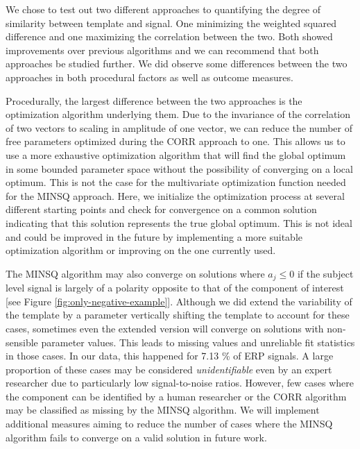 \documentclass[
  man]{apa7}
\begin{document}
We chose to test out two different approaches to quantifying the degree of similarity between template and signal. One minimizing the weighted squared difference and one maximizing the correlation between the two. Both showed improvements over previous algorithms and we can recommend that both approaches be studied further. We did observe some differences between the two approaches in both procedural factors as well as outcome measures.

Procedurally, the largest difference between the two approaches is the optimization algorithm underlying them. Due to the invariance of the correlation of two vectors to scaling in amplitude of one vector, we can reduce the number of free parameters optimized during the CORR approach to one. This allows us to use a more exhaustive optimization algorithm that will find the global optimum in some bounded parameter space without the possibility of converging on a local optimum. This is not the case for the multivariate optimization function needed for the MINSQ approach. Here, we initialize the optimization process at several different starting points and check for convergence on a common solution indicating that this solution represents the true global optimum. This is not ideal and could be improved in the future by implementing a more suitable optimization algorithm or improving on the one currently used.

The MINSQ algorithm may also converge on solutions where \(a_j \le 0\) if the subject level signal is largely of a polarity opposite to that of the component of interest {[}see Figure \ref{fig:only-negative-example}{]}. Although we did extend the variability of the template by a parameter vertically shifting the template to account for these cases, sometimes even the extended version will converge on solutions with non-sensible parameter values. This leads to missing values and unreliable fit statistics in those cases. In our data, this happened for 7.13 \% of ERP signals. A large proportion of these cases may be considered \emph{unidentifiable} even by an expert researcher due to particularly low signal-to-noise ratios. However, few cases where the component can be identified by a human researcher or the CORR algorithm may be classified as missing by the MINSQ algorithm. We will implement additional measures aiming to reduce the number of cases where the MINSQ algorithm fails to converge on a valid solution in future work.
\end{document}
